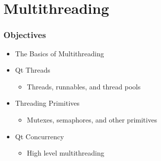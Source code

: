 %
%
%
%

\section{Multithreading}
\begin{slide}
\frametitle{Objectives}
\begin{itemize}
\item The Basics of Multithreading
\item Qt Threads
    \begin{itemize}
    \item Threads, runnables, and thread pools
    \end{itemize}
\item Threading Primitives
    \begin{itemize}
    \item Mutexes, semaphores, and other primitives
    \end{itemize}
\item Qt Concurrency
    \begin{itemize}
    \item High level multithreading
    \end{itemize}
\end{itemize}
\end{slide}


%
%
